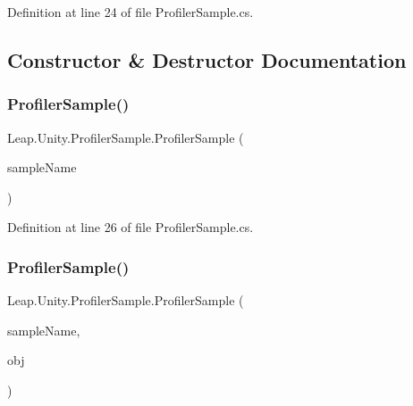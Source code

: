 Definition at line 24 of file Profiler\+Sample.\+cs.



\subsection{Constructor \& Destructor Documentation}
\mbox{\label{struct_leap_1_1_unity_1_1_profiler_sample_a0c710010a1ba9e1f09234c890992ed03}} 
\subsubsection{\texorpdfstring{ProfilerSample()}{ProfilerSample()}\hspace{0.1cm}{\footnotesize\ttfamily [1/2]}}
{\footnotesize\ttfamily Leap.\+Unity.\+Profiler\+Sample.\+Profiler\+Sample (\begin{DoxyParamCaption}\item[{string}]{sample\+Name }\end{DoxyParamCaption})}



Definition at line 26 of file Profiler\+Sample.\+cs.

\mbox{\label{struct_leap_1_1_unity_1_1_profiler_sample_a56e267a950cc3a969f59b30c0189a6f8}} 
\subsubsection{\texorpdfstring{ProfilerSample()}{ProfilerSample()}\hspace{0.1cm}{\footnotesize\ttfamily [2/2]}}
{\footnotesize\ttfamily Leap.\+Unity.\+Profiler\+Sample.\+Profiler\+Sample (\begin{DoxyParamCaption}\item[{string}]{sample\+Name,  }\item[{Unity\+Engine.\+Object}]{obj }\end{DoxyParamCaption})}



